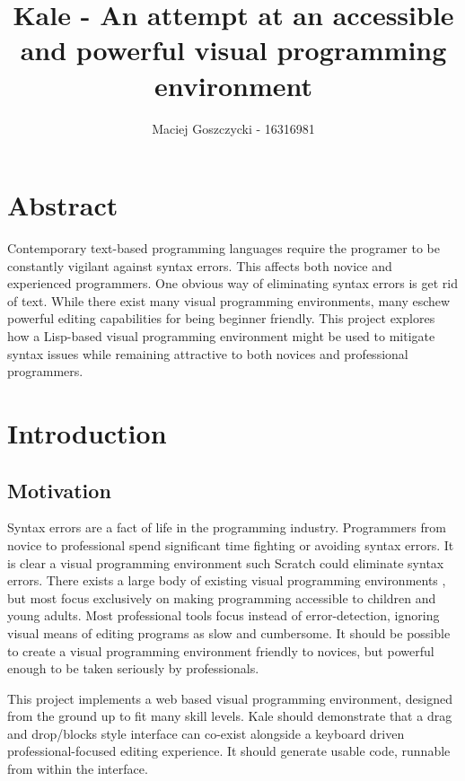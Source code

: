 \documentclass[11pt]{report}
\title{Kale - An attempt at an accessible and powerful visual programming
environment}
\author{Maciej Goszczycki - 16316981}
\date{}
\begin{document}
\maketitle
\newcommand{\ak}[1]{\keys{\arrowkey{#1}}}
\tableofcontents
\clearpage

\begingroup
\let\clearpage\relax

\chapter{Abstract}
Contemporary text-based programming languages require the programer to be
constantly vigilant against syntax errors. This affects both novice and
experienced programmers. One obvious way of eliminating syntax errors is
get rid of text. While there exist many visual programming environments, many
eschew powerful editing capabilities for being beginner friendly.
This project explores how a Lisp-based visual programming environment might be
used to mitigate syntax issues while remaining attractive to both novices and
professional programmers.

\chapter{Introduction}

\section{Motivation}
Syntax errors are a fact of life in the programming industry. Programmers from
novice\cite{Denny2011} to professional spend significant time fighting or
avoiding syntax errors. It is clear a visual programming environment such
Scratch could eliminate syntax errors. There exists a large body of existing
visual programming environments \cite{Beldie1983}, but most focus exclusively
on making programming accessible to children and young adults. Most
professional tools focus instead of error-detection, ignoring visual means of
editing programs as slow and cumbersome. It should be possible to create a
visual programming environment friendly to novices, but powerful enough to be
taken seriously by professionals. 

This project implements a web based visual programming environment, designed
from the ground up to fit many skill levels. Kale should demonstrate that a
drag and drop/blocks style interface can co-exist alongside a keyboard driven
professional-focused editing experience. It should generate usable code,
runnable from within the interface.
\end{document}
